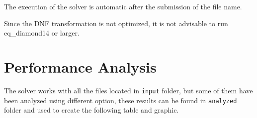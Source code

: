 \documentclass[11pt,a4paper]{article}
\begin{document}
    The execution of the solver is automatic after the submission of the file name.

    Since the DNF transformation is not optimized, it is not advisable to run eq\_diamond14 or larger.

    \section{Performance Analysis}

    The solver works with all the files located in \texttt{input} folder, but some of them have 
    been analyzed using different option, these results can be found in \texttt{analyzed} folder
    and used to create the following table and graphic.

    \newcommand{\selected}{X}
\end{document}

